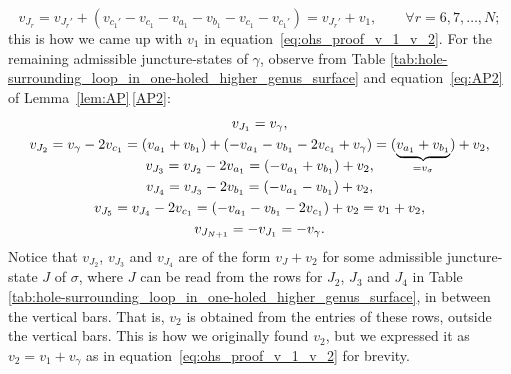 \documentclass[10pt,a4paper]{amsart}
\numberwithin{equation}{section}
\theoremstyle{definition}
\begin{document}
\[
v_{J_r} = v_{J_r'} + (v_{c_1'} - v_{c_1} - v_{a_1} - v_{b_1} - v_{c_1} - v_{c_1'})
= v_{J_r'} + v_1, \qquad \forall r = 6,7,\dots,N;
\]
this is how we came up with $v_1$ in equation~\eqref{eq:ohs_proof_v_1_v_2}.
For the remaining admissible juncture-states of $\gamma$, observe from Table \ref{tab:hole-surrounding_loop_in_one-holed_higher_genus_surface} and equation~\eqref{eq:AP2} of Lemma~\ref{lem:AP}\,\ref{AP2}:
\begin{gather*}
v_{J_1} = v_\gamma, \\
v_{J_2} = v_\gamma - 2 v_{c_1}
= (v_{a_1} + v_{b_1}) + (-v_{a_1} - v_{b_1} - 2v_{c_1} + v_\gamma)
= \smash{(\underbrace{ v_{a_1} + v_{b_1} }_{=v_\sigma})} + v_2, \\
v_{J_3} = v_{J_2} - 2v_{a_1} = (-v_{a_1} + v_{b_1}) + v_2, \\
v_{J_4} = v_{J_3} - 2v_{b_1} = ( - v_{a_1} - v_{b_1}) + v_2, \\
v_{J_5} = v_{J_4} - 2v_{c_1} = (- v_{a_1} - v_{b_1} - 2v_{c_1}) + v_2 = v_1 + v_2, \\
v_{J_{N+1}} = - v_{J_1} = - v_\gamma.
\end{gather*}
Notice that $v_{J_2}$, $v_{J_3}$ and $v_{J_4}$ are of the form $v_J + v_2$ for some admissible juncture-state $J$ of $\sigma$, where $J$ can be read from the rows for $J_2$, $J_3$ and $J_4$ in Table \ref{tab:hole-surrounding_loop_in_one-holed_higher_genus_surface}, in between the vertical bars. That is, $v_2$ is obtained from the entries of these rows, outside the vertical bars. This is how we originally found $v_2$, but we expressed it as $v_2 = v_1 + v_\gamma$ as in equation~\eqref{eq:ohs_proof_v_1_v_2} for brevity.
\end{document}
